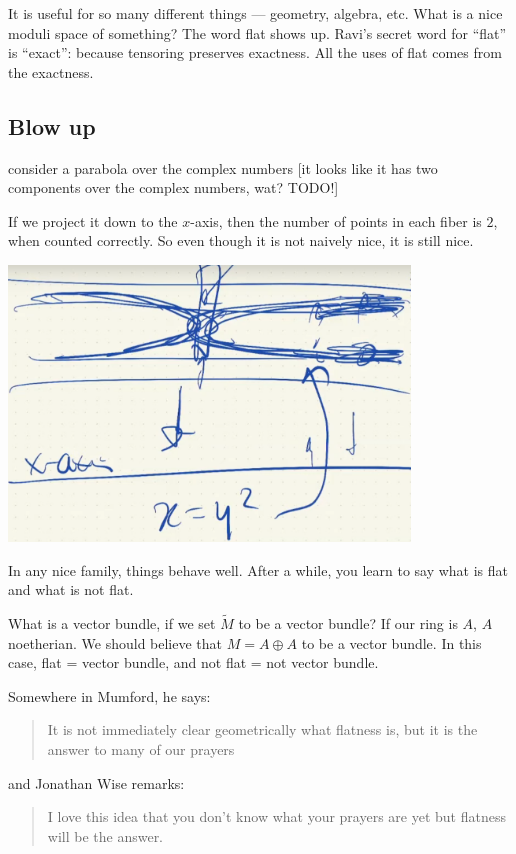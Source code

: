 \documentclass{book}
\newcommand{\osum}{\oplus} %
\theoremstyle{definition}
\begin{document}
It is useful for so many different things --- geometry, algebra, etc. What
is a nice moduli space of something? The word flat shows up. Ravi's secret
word for ``flat'' is ``exact'': because tensoring preserves exactness. 
All the uses of flat comes from the exactness.

\subsection{Blow up}

consider a parabola over the complex numbers [it looks like it has two
components over the complex numbers, wat? TODO!]

If we project it down to the $x$-axis, then the number of points in each
fiber is $2$, when counted correctly. So even though it is not naively nice,
it is still nice.

\includegraphics[width=0.8\textwidth]{parabola-flatness.png}

In any nice family, things behave well. After a while, you learn to say
what is flat and what is not flat.

What is a vector bundle, if we set $\tilde M$ to be a vector bundle? If
our ring is $A$, $A$ noetherian. We should believe that $M = A \osum A$
to be a vector bundle. In this case, flat = vector bundle, and not flat
= not vector bundle.

Somewhere in Mumford, he says:
\begin{quote}
It is not immediately clear geometrically what flatness is, but it is the
answer to many of our prayers
\end{quote}

and Jonathan Wise remarks:
\begin{quote}
I love this idea that you don't know what your prayers are yet but flatness
will be the answer.
\end{quote}
\end{document}
